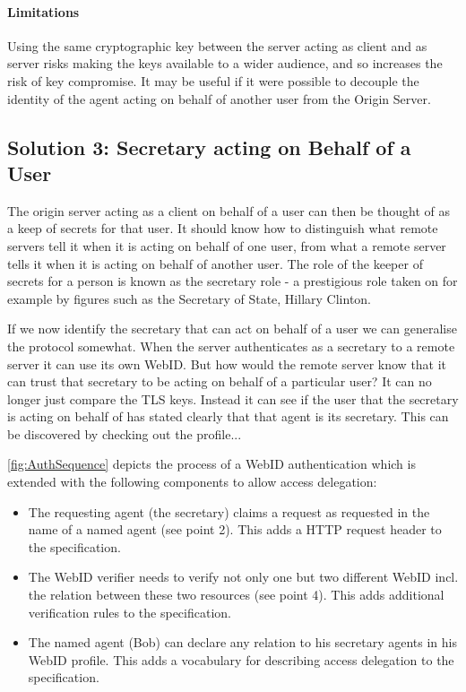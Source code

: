 \documentclass[a4paper]{llncs}
\begin{document}
\paragraph{Limitations}

Using the same cryptographic key between the server acting as client and as server risks making the keys available to a wider audience, and so increases the risk of key compromise. 
It may be useful if it were possible to decouple the identity of the agent acting on behalf of another user from the Origin Server.


\subsection{Solution 3: Secretary acting on Behalf of a User}

The origin server acting as a client on behalf of a user can then be thought of as a keep of secrets for that user.
It should know how to distinguish what remote servers tell it when it is acting on behalf of one user, from what a remote server tells it when it is acting on behalf of another user.
The role of the keeper of secrets for a person is known as the secretary role - a prestigious role taken on for example by figures such as the Secretary of State, Hillary Clinton.

If we now identify the secretary that can act on behalf of a user we can generalise the protocol somewhat.
When the server authenticates as a secretary to a remote server it can use its own WebID.
But how would the remote server know that it can trust that secretary to be acting on behalf of a particular user?
It can no longer just compare the TLS keys.
Instead it can see if the user that the secretary is acting on behalf of has stated clearly that that agent is its secretary.
This can be discovered by checking out the profile... 

\autoref{fig:AuthSequence} depicts the process of a WebID authentication which is extended with the following components to allow access delegation:

\begin{itemize}
    \item The requesting agent (the secretary) claims a request as requested in the name of a named agent (see point 2).
        This adds a HTTP request header to the specification.
    \item The WebID verifier needs to verify not only one but two different WebID incl. the relation between these two resources (see point 4).
        This adds additional verification rules to the specification.
    \item The named agent (Bob) can declare any relation to his secretary agents in his WebID profile.
        This adds a vocabulary for describing access delegation to the specification.
\end{itemize}
\end{document}

